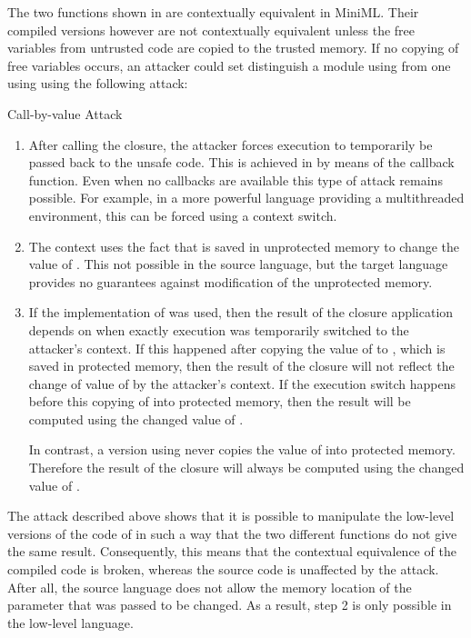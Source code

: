The two functions shown in  are contextually equivalent in \mbox{MiniML}.
Their compiled versions however are not contextually equivalent unless the free variables from untrusted code are copied to the trusted memory.
If no copying of free variables occurs, an attacker could set distinguish a module using  from one using  using the following attack:


\begin{attack}{Call-by-value Attack}
\begin{enumerate}
\item After calling the closure, the attacker forces execution to temporarily be passed back to the unsafe code.
This is achieved in  by means of the callback function. 
Even when no callbacks are available this type of attack remains possible. For example, in a more powerful language providing a multithreaded environment, this can be forced using a context switch.
\item The context uses the fact that  is saved in unprotected memory to change the value of . This not possible in the source language, but the target language provides no guarantees against modification of the unprotected memory.
\item If the implementation of  was used, then the result of the closure application depends on when exactly execution was temporarily switched to the attacker's context.
If this happened after copying the value of  to , which is saved in protected memory, then the result of the closure will not reflect the change of value of  by the attacker's context.
If the execution switch happens before this copying of  into protected memory, then the result will be computed using the changed value of .

In contrast, a version using   never copies the value of  into protected memory. 
Therefore the result of the closure will always be computed using the changed value of .
\end{enumerate}
\end{attack}


The attack described above shows that it is possible to manipulate the low-level versions of the code of  in such a way that the two different functions do not give the same result. 
Consequently, this means that the contextual equivalence of the compiled code is broken, whereas the source code is unaffected by the attack.
After all, the source language does not allow the memory location of the parameter that was passed to be changed. As a result, step 2 is only possible in the low-level language.

